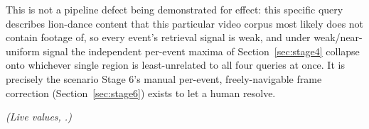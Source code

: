 This is not a pipeline defect being demonstrated for effect: this specific
query describes lion-dance content that this particular video corpus most
likely does not contain footage of, so every event's retrieval signal is
weak, and under weak/near-uniform signal the independent per-event maxima of
Section~\ref{sec:stage4} collapse onto whichever single region is
least-unrelated to all four queries at once. It is precisely the scenario
Stage 6's manual per-event, freely-navigable frame correction
(Section~\ref{sec:stage6}) exists to let a human resolve.

\emph{(Live values, .)}

